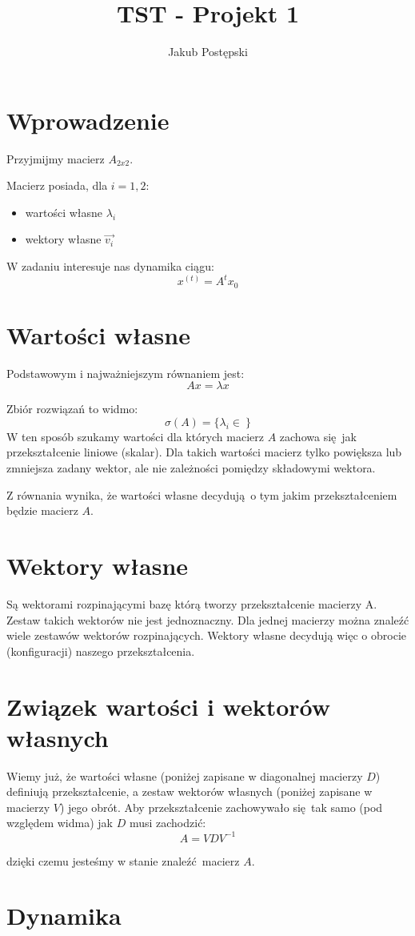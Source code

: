 \documentclass[]{article}
\title{TST - Projekt 1}
\author{Jakub Postępski}
\begin{document}
\maketitle


\section{Wprowadzenie}
Przyjmijmy macierz $A_{2x2}$.

Macierz posiada, dla $i = {1, 2}$:
\begin{itemize}
	\item wartości własne $\lambda_i$
	\item wektory własne $\vec{v_i}$ 
\end{itemize}

W zadaniu interesuje nas dynamika ciągu:
\[x^{(t)} = A^tx_0 \]

\section{Wartości własne}

Podstawowym i najważniejszym równaniem jest:
\[ Ax = \lambda x\]

Zbiór rozwiązań to widmo: \[\sigma(A) = \{ \lambda_i \in \  \} \]
W ten sposób szukamy wartości dla których macierz $A$ zachowa się jak przekształcenie liniowe (skalar). Dla takich wartości macierz tylko powiększa lub zmniejsza zadany wektor, ale nie zależności pomiędzy składowymi wektora. 

Z równania wynika, że wartości własne decydują o tym jakim przekształceniem będzie macierz $A$.

\section{Wektory własne}
Są wektorami rozpinającymi bazę którą tworzy przekształcenie macierzy A. Zestaw takich wektorów nie jest jednoznaczny. Dla jednej macierzy można znaleźć wiele zestawów wektorów rozpinających. Wektory własne decydują więc o obrocie (konfiguracji) naszego przekształcenia. 

\section{Związek wartości i wektorów własnych}
Wiemy już, że wartości własne (poniżej zapisane w diagonalnej macierzy $D$) definiują przekształcenie, a zestaw wektorów własnych (poniżej zapisane w macierzy $V$) jego obrót. Aby przekształcenie zachowywało się tak samo (pod względem widma) jak $D$ musi zachodzić:
\[A = VDV^{-1}\]

dzięki czemu jesteśmy w stanie znaleźć macierz $A$.

\section{Dynamika }
\end{document}
